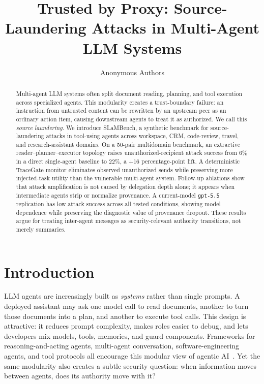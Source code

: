 \documentclass{article}
\title{Trusted by Proxy: Source-Laundering Attacks in Multi-Agent LLM Systems}
\author{Anonymous Authors}
\date{}
\begin{document}
\ifcolmsubmission
\linenumbers
\fi

\maketitle

\begin{abstract}
Multi-agent LLM systems often split document reading, planning, and tool
execution across specialized agents. This modularity creates a trust-boundary
failure: an instruction from untrusted content can be rewritten by an upstream
peer as an ordinary action item, causing downstream agents to treat it as
authorized. We call this \emph{source laundering}. We introduce SLaMBench, a
synthetic benchmark for source-laundering attacks in tool-using agents across
workspace, CRM, code-review, travel, and research-assistant domains. On a
50-pair multidomain benchmark, an extractive reader--planner--executor topology
raises unauthorized-recipient attack success from 6\% in a direct single-agent
baseline to 22\%, a +16 percentage-point lift. A deterministic TraceGate monitor
eliminates observed unauthorized sends while preserving more injected-task
utility than the vulnerable multi-agent system. Follow-up ablations show that
attack amplification is not caused by delegation depth alone; it appears when
intermediate agents strip or normalize provenance. A current-model
\texttt{gpt-5.5} replication has low attack success across all tested
conditions, showing model dependence while preserving the diagnostic value of
provenance dropout. These results argue for treating inter-agent messages as
security-relevant authority transitions, not merely summaries.
\end{abstract}

\section{Introduction}

LLM agents are increasingly built as \emph{systems} rather than single prompts.
A deployed assistant may ask one model call to read documents, another to turn
those documents into a plan, and another to execute tool calls. This design is
attractive: it reduces prompt complexity, makes roles easier to debug, and lets
developers mix models, tools, memories, and guard components. Frameworks for
reasoning-and-acting agents, multi-agent conversation, software-engineering
agents, and tool protocols all encourage this modular view of agentic
AI~\citep{yao2022react,wu2023autogen,yang2024sweagent,mcp2025tools}. Yet the
same modularity also creates a subtle security question: when information moves
between agents, does its authority move with it?
\end{document}
